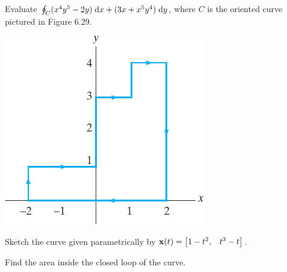 \documentclass[boxes]{gsypset}
\begin{document}
	\begin{problem}[6.2.13]
		Evaluate $\oint_C (x^4y^5 - 2y)\;\mathrm{d}x + (3x + x^5y^4)\;\mathrm{d}y$, 
		where $C$ is the oriented curve pictured in Figure 6.29.
		
		\begin{center}
			\includegraphics{img/6_2_13}
			\renewcommand{\thefigure}{6.29}
		\end{center}
	\end{problem}
	\begin{solution}
		
	\end{solution}
	
	\begin{problem}[6.2.15]
		\begin{subproblems}
			\subproblem Sketch the curve given parametrically by $\mathbf{x}(t) = \begin{bmatrix}1-t^2, & t^3-t\end{bmatrix}$.
				\begin{solution}
					
				\end{solution}
			\subproblem Find the area inside the closed loop of the curve.
				\begin{solution}
					
				\end{solution}
		\end{subproblems}
	\end{problem}
	
\end{document}
